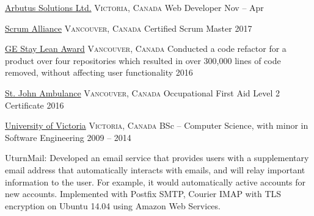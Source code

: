 \documentclass[10pt,a4paper]{article}
\begin{document}
\headedsection  %
  {\href{http://arbutussolutions.com/}{Arbutus Solutions Ltd.}}
  {\textsc{Victoria, Canada}} {
  \headedsubsection
    {Web Developer}
    {Nov  -- Apr }
    {}
}

\spacedhrule{0.5em}{-0.4em}

\headedsection
  {\href{https://www.scrumalliance.org/}{Scrum Alliance}}
  {\textsc{Vancouver, Canada}} {
  \headedsubsection
    {Certified Scrum Master}
    {2017}
    {}
}

\headedsection
  {\href{https://www.ge.com}{GE Stay Lean Award}}
  {\textsc{Vancouver, Canada}} {
  \headedsubsection
    {Conducted a code refactor for a product over four repositories which resulted in over 300,000 lines of code removed, without affecting user functionality }
    {2016}
    {}
}

\headedsection
  {\href{https://www.sja.ca}{St. John Ambulance}}
  {\textsc{Vancouver, Canada}} {
  \headedsubsection
    {{Occupational First Aid Level 2 Certificate}}
    {2016}
    {}
}

\vspace{0.5em}


\spacedhrule{1.6em}{-0.4em}


\headedsection
  {\href{https://www.uvic.ca/}{University of Victoria}}
  {\textsc{Victoria, Canada}} {
  \headedsubsection
    {BSc -- Computer Science, with minor in Software Engineering}
    {2009 -- 2014}
    {}
}

\spacedhrule{0.5em}{-0.4em}

\inlineheadsection
  {UturnMail:}
  {Developed an email service that provides users with a supplementary
email address that automatically interacts with emails, and will relay important information to the user. For example, it would automatically active accounts for new accounts.
Implemented with Postfix SMTP, Courier IMAP with TLS encryption on Ubuntu 14.04 using Amazon Web Services.}
\end{document}
